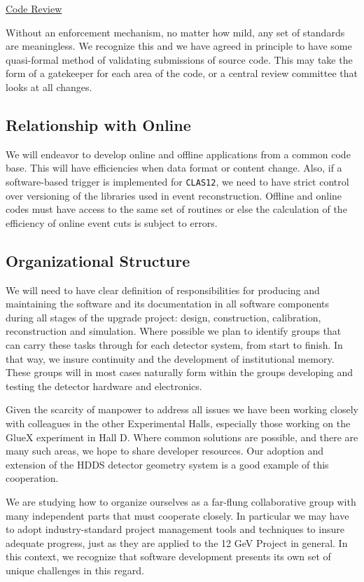 \documentclass[12pt]{article}
\begin{document}
\vskip 0.3cm

\noindent
\underline{Code Review}

Without an enforcement mechanism, no matter how mild, any set of standards 
are meaningless. We recognize this and we have agreed in principle to have 
some quasi-formal method of validating submissions of source code. This may 
take the form of a gatekeeper for each area of the code, or a central review 
committee that looks at all changes.

\vskip 0.3cm

\noindent
\subsection{Relationship with Online}

We will endeavor to develop online and offline applications from a common 
code base. This will have efficiencies when data format or content change. 
Also, if a software-based trigger is implemented for {\tt CLAS12}, we need 
to have strict control over versioning of the libraries used in event 
reconstruction. Offline and online codes must have access to the same set 
of routines or else the calculation of the efficiency of online event cuts 
is subject to errors.

\vskip 0.3cm

\noindent
\subsection{Organizational Structure}

We will need to have clear definition of responsibilities for producing and 
maintaining the software and its documentation in all software components 
during all stages of the upgrade project: design, construction, calibration, 
reconstruction and simulation. Where possible we plan to identify groups that 
can carry these tasks through for each detector system, from start to finish. 
In that way, we insure continuity and the development of institutional memory. 
These groups will in most cases naturally form within the groups developing 
and testing the detector hardware and electronics.

Given the scarcity of manpower to address all issues we have been working 
closely with colleagues in the other Experimental Halls, especially those 
working on the GlueX experiment in Hall D. Where common solutions are 
possible, and there are many such areas, we hope to share developer resources. 
Our adoption and extension of the HDDS detector geometry system is a good 
example of this cooperation.

We are studying how to organize ourselves as a far-flung collaborative group 
with many independent parts that must cooperate closely. In particular we may 
have to adopt industry-standard project management tools and techniques to 
insure adequate progress, just as they are applied to the 12 GeV Project in 
general.  In this context, we recognize that software development presents 
its own set of unique challenges in this regard.
\end{document}
